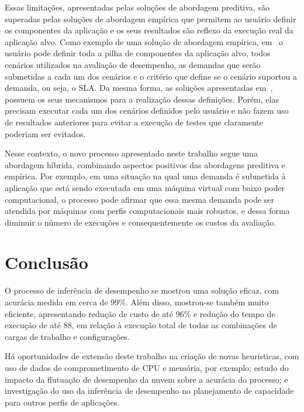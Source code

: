 \documentclass[12pt]{article}
\begin{document}
Essas limitações, apresentadas pelas soluções de abordagem preditiva, são superadas pelas soluções de abordagem empírica que permitem ao usuário definir os componentes da aplicação e os seus resultados são reflexo da execução real da aplicação alvo. Como exemplo de uma solução de abordagem empírica, em~\cite{cunhacloud} o usuário pode definir toda a pilha de componentes da aplicação alvo, todos cenários utilizados na avaliação de desempenho, as demandas que serão submetidas a cada um dos cenários e o critério que define se o cenário suportou a demanda, ou seja, o SLA. Da mesma forma, as soluções apresentadas em~\cite{jayasinghe2012,silva2013cloudbench,scheuner2014cloud}, possuem os seus mecanismos para a realização dessas definições. Porém, elas precisam executar cada um dos cenários definidos pelo usuário e não fazem uso de resultados anteriores para evitar a execução de testes que claramente poderiam ser evitados.

Nesse contexto, o novo processo apresentado neste trabalho segue uma abordagem híbrida, combinando aspectos positivos das abordagens preditiva e empírica. Por exemplo, em uma situação na qual uma demanda é submetida à aplicação que está sendo executada em uma máquina virtual com baixo poder computacional, o processo pode afirmar que essa mesma demanda pode ser atendida por máquinas com perfis computacionais mais robustos, e dessa forma diminuir o número de execuções e consequentemente os custos da avaliação.


\section{Conclusão}\label{sec:conclusion}

O processo de inferência de desempenho se mostrou uma solução eficaz, com acurácia medida em cerca de 99\%.
Além disso, mostrou-se também muito eficiente, apresentando redução de custo de até 96\% e redução do tempo
de execução de até 88, em relação à execução total de todas as combinações de cargas de trabalho e configurações.

Há oportunidades de extensão deste trabalho na criação de novas heurísticas, com uso de dados de comprometimento
de CPU e memória, por exemplo; estudo do impacto da flutuação de desempenho da nuvem sobre a acurácia do processo;
e investigação do uso da inferência de desempenho no planejamento de capacidade para outros perfis de aplicações.




\end{document}
